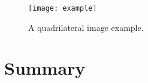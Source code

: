 \Blindtext

\begin{figure}[!htbp]
	\centering
		\texttt{[image: example]}
	\caption{A quadrilateral image example.}
	\label{fig:exampletc}
\end{figure}

\section{Summary}